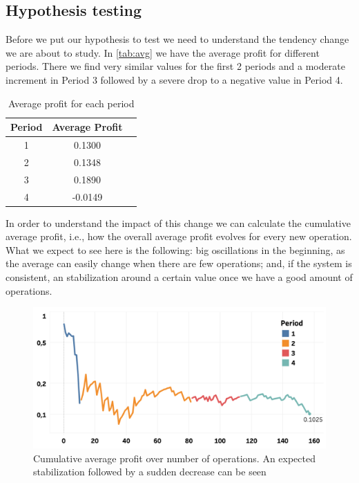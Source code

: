 \documentclass[sigconf, nonacm]{acmart}
\begin{document}
\subsection{Hypothesis testing}

Before we put our hypothesis to test we need to understand the tendency change we are about to study. In \autoref{tab:avg} we have the average profit for different periods. There we find very similar values for the first 2 periods and a moderate increment in Period 3 followed by a severe drop to a negative value in Period 4.

\begin{table}[hb]%
  \caption{Average profit for each period}
  \label{tab:avg}
  \begin{tabular}{ccl}
    \toprule
    Period & Average Profit\\
    \midrule
    1 & 0.1300\\
    2 & 0.1348\\
    3 & 0.1890\\
    4 & -0.0149\\
  \bottomrule
\end{tabular}
\end{table}

In order to understand the impact of this change we can calculate the cumulative average profit, i.e., how the overall average profit evolves for every new operation. What we expect to see here is the following: big oscillations in the beginning, as the average can easily change when there are few operations; and, if the system is consistent, an stabilization around a certain value once we have a good amount of operations.

\begin{figure}[hb]
  \centering
  \includegraphics[width=\linewidth]{figures/pic2}
  \caption{Cumulative average profit over number of operations. An expected stabilization followed by a sudden decrease can be seen}
  \label{fig:chick}
\end{figure}
\end{document}

